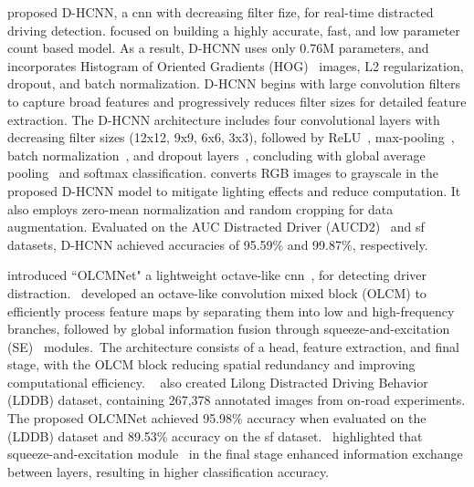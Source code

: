 \citet{26_MIM_qin2021distracted} proposed D-HCNN, a \gls{cnn} with decreasing filter fize, for real-time distracted driving detection. \citet{26_MIM_qin2021distracted} focused on building a highly accurate, fast, and low parameter count based model. As a result,  D-HCNN uses only 0.76M parameters, and incorporates Histogram of Oriented Gradients (HOG)~\citep{HOG_dalal2005histograms} images, L2 regularization, dropout, and batch normalization. D-HCNN begins with large convolution filters to capture broad features and progressively reduces filter sizes for detailed feature extraction. The D-HCNN architecture includes four convolutional layers with decreasing filter sizes (12x12, 9x9, 6x6, 3x3), followed by ReLU~\citep{ReLU_DBLP:journals/corr/abs-1803-08375}, max-pooling~\citep{Max_Pooling_32}, batch normalization~\citep{Batch_Norm_DBLP:journals/corr/IoffeS15}, and dropout layers~\citep{dropout_srivastava2014dropout}, concluding with global average pooling~\citep{Global_avg_pooling_Lin2013NetworkIN} and softmax classification. \citet{26_MIM_qin2021distracted} converts RGB images to grayscale in the proposed D-HCNN model to mitigate lighting effects and reduce computation. It also employs zero-mean normalization and random cropping for data augmentation. Evaluated on the AUC Distracted Driver (AUCD2)~\citep{AUC_D3_dataset_abouelnaga2017real} and \gls{sf} datasets, D-HCNN achieved accuracies of 95.59\% and 99.87\%, respectively.

\citet{57_MIM_octave_CNN_9457109} introduced ``OLCMNet" a lightweight octave-like \gls{cnn}~\citep{octave_convolution_chen2019drop}, for detecting driver distraction.~\citet{57_MIM_octave_CNN_9457109} developed an octave-like convolution mixed block (OLCM) to efficiently process feature maps by separating them into low and high-frequency branches, followed by global information fusion through squeeze-and-excitation (SE)~\citep{SE_module_hu2018squeeze} modules.~The architecture consists of a head, feature extraction, and final stage, with the OLCM block reducing spatial redundancy and improving computational efficiency. ~\citet{57_MIM_octave_CNN_9457109} also created Lilong Distracted Driving Behavior (LDDB) dataset, containing 267,378 annotated images from on-road experiments. The proposed OLCMNet achieved 95.98\% accuracy when evaluated on the (LDDB) dataset and 89.53\% accuracy on the \gls{sf} dataset.~\citet{57_MIM_octave_CNN_9457109} highlighted that squeeze-and-excitation module~\citep{SE_module_hu2018squeeze} in the final stage enhanced information exchange between layers, resulting in higher classification accuracy.

